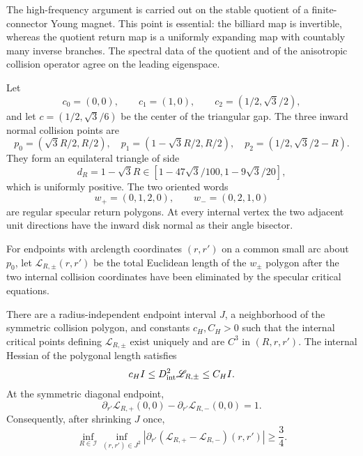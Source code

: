 The high-frequency argument is carried out on the stable quotient of a
finite-connector Young magnet.  This point is essential: the billiard map is
invertible, whereas the quotient return map is a uniformly expanding map with
countably many inverse branches.  The spectral data of the quotient and of
the anisotropic collision operator agree on the leading eigenspace.

Let
\[
 c_0=(0,0),\qquad c_1=(1,0),\qquad
 c_2=(1/2,\sqrt3/2),
\]
and let \(c=(1/2,\sqrt3/6)\) be the center of the triangular gap.  The three
inward normal collision points are
\[
 p_0=(\sqrt3R/2,R/2),\quad
 p_1=(1-\sqrt3R/2,R/2),\quad
 p_2=(1/2,\sqrt3/2-R).
\]
They form an equilateral triangle of side
\[
 d_R=1-\sqrt3R\in[1-47\sqrt3/100,1-9\sqrt3/20],
\]
which is uniformly positive.  The two oriented words
\[
 w_+=(0,1,2,0),\qquad w_-=(0,2,1,0)
\]
are regular specular return polygons.  At every internal vertex the two
adjacent unit directions have the inward disk normal as their angle bisector.

For endpoints with arclength coordinates \((r,r')\) on a common small arc
about \(p_0\), let \(\mathscr L_{R,\pm}(r,r')\) be the total Euclidean length
of the \(w_\pm\) polygon after the two internal collision coordinates have
been eliminated by the specular critical equations.

\begin{lemma}
\label{lem:r3-a2-polygon}
There are a radius-independent endpoint interval \(J\), a neighborhood of the
symmetric collision polygon, and constants \(c_H,C_H>0\) such that the
internal critical points defining \(\mathscr L_{R,\pm}\) exist uniquely and
are \(C^3\) in \((R,r,r')\).  The internal Hessian of the polygonal length
satisfies
\[
 c_H I\le D^2_{\rm int}\mathscr L_{R,\pm}\le C_H I.
\]
At the symmetric diagonal endpoint,
\[
 \partial_{r'}\mathscr L_{R,+}(0,0)
 -\partial_{r'}\mathscr L_{R,-}(0,0)=1.
\]
Consequently, after shrinking \(J\) once,
\[
 \inf_{R\in\mathcal I}\inf_{(r,r')\in J^2}
 \left|\partial_{r'}(\mathscr L_{R,+}-
 \mathscr L_{R,-})(r,r')\right|\ge\frac34.
\]
\end{lemma}

